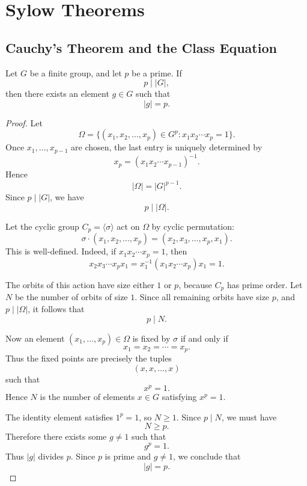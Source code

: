 \chapter{Sylow Theorems}

\section{Cauchy's Theorem and the Class Equation}

\begin{theorem}\label{thm:cauchy}
Let $G$ be a finite group, and let $p$ be a prime. If
\[
    p\mid |G|,
\]
then there exists an element $g\in G$ such that
\[
    |g|=p.
\]
\end{theorem}

\begin{proof}
    Let
    \[
        \Omega
        =
        \{(x_1,x_2,\ldots,x_p)\in G^p : x_1x_2\cdots x_p=1\}.
    \]
    Once \(x_1,\ldots,x_{p-1}\) are chosen, the last entry is uniquely determined by
    \[
        x_p=(x_1x_2\cdots x_{p-1})^{-1}.
    \]
    Hence
    \[
        |\Omega|=|G|^{p-1}.
    \]
    Since \(p\mid |G|\), we have
    \[
        p\mid |\Omega|.
    \]
    
    Let the cyclic group \(C_p=\langle \sigma\rangle\) act on \(\Omega\) by cyclic permutation:
    \[
        \sigma\cdot (x_1,x_2,\ldots,x_p)
        =
        (x_2,x_3,\ldots,x_p,x_1).
    \]
    This is well-defined. Indeed, if \(x_1x_2\cdots x_p=1\), then
    \[
        x_2x_3\cdots x_px_1
        =
        x_1^{-1}(x_1x_2\cdots x_p)x_1
        =
        1.
    \]
    
    The orbits of this action have size either \(1\) or \(p\), because \(C_p\) has prime order.
    Let \(N\) be the number of orbits of size \(1\). Since all remaining orbits have size \(p\), and
    \(p\mid |\Omega|\), it follows that
    \[
        p\mid N.
    \]
    
    Now an element \((x_1,\ldots,x_p)\in\Omega\) is fixed by \(\sigma\) if and only if
    \[
        x_1=x_2=\cdots=x_p.
    \]
    Thus the fixed points are precisely the tuples
    \[
        (x,x,\ldots,x)
    \]
    such that
    \[
        x^p=1.
    \]
    Hence \(N\) is the number of elements \(x\in G\) satisfying \(x^p=1\).
    
    The identity element satisfies \(1^p=1\), so \(N\geq 1\). Since \(p\mid N\), we must have
    \[
        N\geq p.
    \]
    Therefore there exists some \(g\neq 1\) such that
    \[
        g^p=1.
    \]
    Thus \(|g|\) divides \(p\). Since \(p\) is prime and \(g\neq 1\), we conclude that
    \[
        |g|=p.
    \]
    \end{proof}

